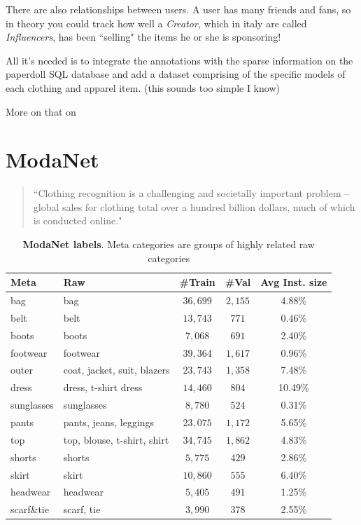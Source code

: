 There are also relationships between users. A user has many friends and fans, so in theory you could track how well a \emph{Creator}, which in italy are called \emph{Influencers}, has been “selling" the items he or she is sponsoring!

All it's needed is to integrate the \modanet annotations with the sparse information on the paperdoll SQL database and add a dataset comprising of the specific models of each clothing and apparel item. (this sounds too simple I know)

More on that on 

\section{ModaNet}\label{s:ds-modanet}

\begin{quotation}
	“Clothing recognition is a challenging and societally important problem – global sales for clothing total over a hundred billion dollars, much of which is conducted online." \cite{yamaguchi2013paper}
\end{quotation}

\begin{table}[H]
\centering
\small
\caption{\textbf{ModaNet labels}. Meta categories are groups of highly related raw categories}
\label{t:modanet statistics}
\begin{tabularx}{\textwidth}{@{}lXccc@{}}
\hline
Meta & Raw & \#Train & \#Val & Avg Inst. size\\
\hline
bag  & bag & $36,699$  & $2,155$  & 4.88\% \\
belt  & belt & $13,743$ & $771$ & 0.46\% \\
boots  & boots & $7,068$ & $691$ & 2.40\%  \\
footwear  & footwear & $39,364$ & $1,617$ & 0.96\% \\
outer  & coat, jacket, suit, blazers
& $23,743$ & $1,358$ & 7.48\% \\
dress  & dress, t-shirt dress & $14,460$ & $804$ & 10.49\% \\
sunglasses  & sunglasses &  $8,780$ & $524$ & 0.31\% \\
pants  & pants, jeans, leggings & $23,075$  &  $1,172$ & 5.65\% \\
top  & top, blouse, t-shirt, shirt & $34,745$ & $1,862$ & 4.83\% \\ 
shorts  & shorts & $5,775$ & $429$ & 2.86\% \\ 
skirt  & skirt & $10,860$  & $555$ &  6.40\% \\ 
headwear  & headwear & $5,405$ & $491$ & 1.25\% \\ 
scarf\&tie  & scarf, tie & $3,990$ & $378$ & 2.55\%  \\ 
\hline
\end{tabularx}
\end{table}

